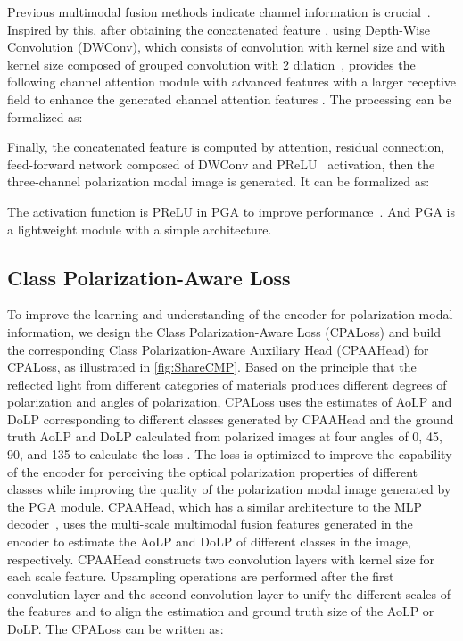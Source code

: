 \documentclass[10pt,twocolumn,letterpaper]{article}
\begin{document}
Previous multimodal fusion methods indicate channel information is crucial~\cite{46,47}. Inspired by this, after obtaining the concatenated feature , using Depth-Wise Convolution (DWConv), which consists of convolution with  kernel size and with  kernel size composed of grouped convolution with 2 dilation~\cite{43}, provides the following channel attention module with advanced features with a larger receptive field to enhance the generated channel attention features . The processing can be formalized as:

Finally, the concatenated feature  is computed by attention, residual connection, feed-forward network composed of DWConv and PReLU~\cite{45} activation, then the three-channel polarization modal image  is generated. It can be formalized as:

The activation function is PReLU in PGA to improve performance~\cite{43}. And PGA is a lightweight module with a simple architecture.


\subsection{Class Polarization-Aware Loss}
\label{sec:cpaloss}


To improve the learning and understanding of the encoder for polarization modal information, we design the Class Polarization-Aware Loss (CPALoss) and build the corresponding Class Polarization-Aware Auxiliary Head (CPAAHead) for CPALoss, as illustrated in \cref{fig:ShareCMP}. Based on the principle that the reflected light from different categories of materials produces different degrees of polarization and angles of polarization, CPALoss uses the estimates of AoLP and DoLP corresponding to different classes generated by CPAAHead and the ground truth AoLP and DoLP calculated from polarized images at four angles of 0, 45, 90, and 135 to calculate the loss . The loss is optimized to improve the capability of the encoder for perceiving the optical polarization properties of different classes while improving the quality of the polarization modal image generated by the PGA module. CPAAHead, which has a similar architecture to the MLP decoder~\cite{26}, uses the multi-scale multimodal fusion features generated in the encoder to estimate the AoLP and DoLP of different classes in the image, respectively. CPAAHead constructs two convolution layers with  kernel size for each scale feature. Upsampling operations are performed after the first convolution layer and the second convolution layer to unify the different scales of the features and to align the estimation and ground truth size of the AoLP or DoLP. The CPALoss can be written as:
\end{document}
